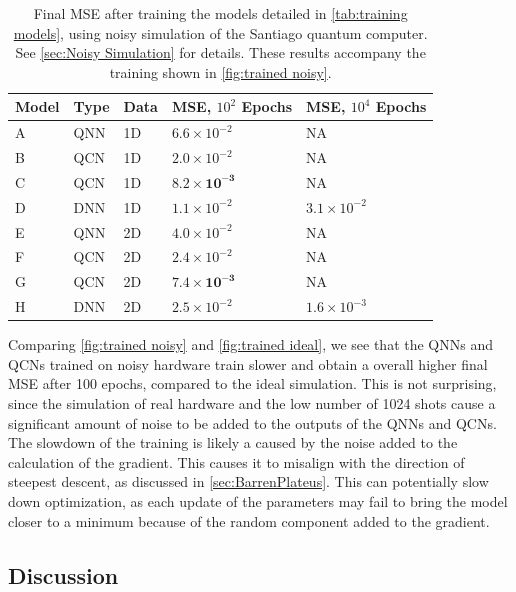 \begin{table}[H]
\centering
\caption{Final MSE after training the models detailed in \autoref{tab:training models}, using noisy simulation of the Santiago quantum computer. See \autoref{sec:Noisy Simulation} for details. These results accompany the training shown in \autoref{fig:trained noisy}.} 
\begin{tabular}{|l|l|l|l|l|}
\hline
Model& Type& Data& MSE, $10^{2}$ Epochs& MSE, $10^{4}$ Epochs \\ \hline
A    & QNN & 1D  & $6.6 \times 10^{-2}$   & NA   \\ \hline
B    & QCN & 1D  & $2.0\times 10^{-2}$  & NA \\ \hline
C    & QCN & 1D  & $\boldsymbol{8.2\times 10^{-3}}$  & NA  \\ \hline
D    & DNN & 1D  & $1.1\times 10^{-2}$ & $3.1\times 10^{-2}$  \\ \Xhline{2\arrayrulewidth}
E    & QNN & 2D  &  $4.0 \times 10^{-2}$                  & NA  \\ \hline
F    & QCN & 2D  &  $2.4\times 10^{-2}$ & NA  \\ \hline
G    & QCN & 2D  &  $\boldsymbol{7.4\times 10^{-3}}$ & NA  \\ \hline
H    & DNN & 2D  &  $2.5\times10^{-2}$ & $1.6\times10^{-3}$\\\hline
\end{tabular}

\label{tab:training models mse noisy}
\end{table}

Comparing \autoref{fig:trained noisy} and \autoref{fig:trained ideal}, we see that the QNNs and QCNs trained on noisy hardware train slower and obtain a overall higher final MSE after 100 epochs, compared to the ideal simulation. This is not surprising, since the simulation of real hardware and the low number of 1024 shots cause a significant amount of noise to be added to the outputs of the QNNs and QCNs. The slowdown of the training is likely a caused by the noise added to the calculation of the gradient. This causes it to misalign with the direction of steepest descent, as discussed in \autoref{sec:BarrenPlateus}. This can potentially slow down optimization, as each update of the parameters may fail to bring the model closer to a minimum because of the random component added to the gradient.



\subsection{Discussion}\label{sec:Training Discussion}


